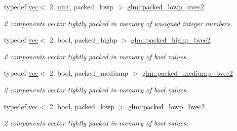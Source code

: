 \begin{DoxyCompactItemize}
\mbox{\label{group__gtc__type__aligned_ga48ab6ca01a9d2418365ca7c3ea1183e8}} 
typedef \hyperlink{structglm_1_1vec}{vec}$<$ 2, \hyperlink{group__core__precision_ga4fd29415871152bfb5abd588334147c8}{uint}, packed\+\_\+lowp $>$ \hyperlink{group__gtc__type__aligned_ga48ab6ca01a9d2418365ca7c3ea1183e8}{glm\+::packed\+\_\+lowp\+\_\+uvec2}
\begin{DoxyCompactList}\small\item\em 2 components vector tightly packed in memory of unsigned integer numbers. \end{DoxyCompactList}\item 
\mbox{\label{group__gtc__type__aligned_ga8059c50785881a9f30b9a8e3ff5daf83}} 
typedef \hyperlink{structglm_1_1vec}{vec}$<$ 2, bool, packed\+\_\+highp $>$ \hyperlink{group__gtc__type__aligned_ga8059c50785881a9f30b9a8e3ff5daf83}{glm\+::packed\+\_\+highp\+\_\+bvec2}
\begin{DoxyCompactList}\small\item\em 2 components vector tightly packed in memory of bool values. \end{DoxyCompactList}\item 
\mbox{\label{group__gtc__type__aligned_ga5c9715603d1138006760556f02aacad5}} 
typedef \hyperlink{structglm_1_1vec}{vec}$<$ 2, bool, packed\+\_\+mediump $>$ \hyperlink{group__gtc__type__aligned_ga5c9715603d1138006760556f02aacad5}{glm\+::packed\+\_\+mediump\+\_\+bvec2}
\begin{DoxyCompactList}\small\item\em 2 components vector tightly packed in memory of bool values. \end{DoxyCompactList}\item 
\mbox{\label{group__gtc__type__aligned_gac3a7ad6d846a92b3e5d708cbb51b1f24}} 
typedef \hyperlink{structglm_1_1vec}{vec}$<$ 2, bool, packed\+\_\+lowp $>$ \hyperlink{group__gtc__type__aligned_gac3a7ad6d846a92b3e5d708cbb51b1f24}{glm\+::packed\+\_\+lowp\+\_\+bvec2}
\begin{DoxyCompactList}\small\item\em 2 components vector tightly packed in memory of bool values. \end{DoxyCompactList}\item 
\mbox{\label{group__gtc__type__aligned_ga9ddb18aa4936b5aa354fcefe179675af}} 

\end{DoxyCompactItemize}

